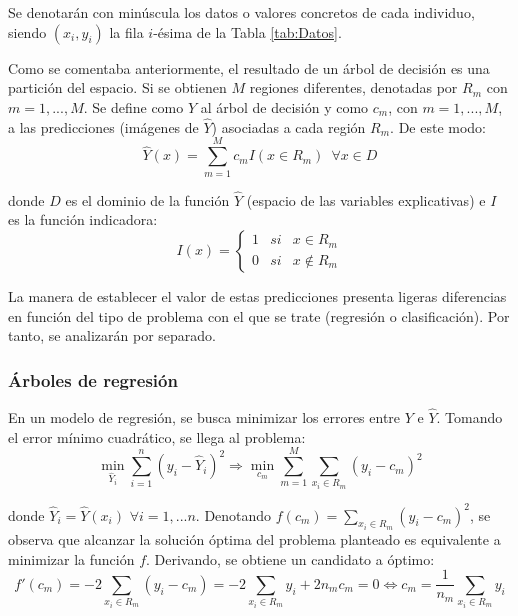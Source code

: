 \documentclass[12pt,twoside]{article}
\begin{document}
Se denotarán con minúscula los datos o valores concretos de cada individuo, siendo $(x_i, y_i)$ la fila $i$-ésima de la Tabla \ref{tab:Datos}.

Como se comentaba anteriormente, el resultado de un árbol de decisión es una partición del espacio. Si se obtienen $M$ regiones diferentes, denotadas por $R_{m}$ con $m = 1, ..., M$. Se define como $\hat{Y}$ al árbol de decisión y como $c_m$, con $m = 1,...,M$, a las predicciones (imágenes de $\hat{Y}$) asociadas a cada región $R_m$. De este modo:
\begin{equation*}
\hat{Y}(x) = \sum^M_{m = 1} c_{m}I(x \in R_m) \, \, \, \forall x \in D
\end{equation*}

\noindent
donde $D$ es el dominio de la función $\hat{Y}$ (espacio de las variables explicativas) e $I$ es la función indicadora:
\begin{equation*}
I(x) = 
\left\{
\begin{array}{ccc}
1 & si & x \in R_m \\
0 & si & x \not\in R_m 
\end{array}
\right.
\end{equation*}

La manera de establecer el valor de estas predicciones presenta ligeras diferencias en función del tipo de problema con el que se trate (regresión o clasificación). Por tanto, se analizarán por separado.


\subsubsection{Árboles de regresión}
En un modelo de regresión, se busca minimizar los errores entre $Y$ e $\hat{Y}$. Tomando el error mínimo cuadrático, se llega al problema:
\begin{equation*}
\min_{\hat{Y}_i} \sum_{i=1}^n (y_i - \hat{Y}_i)^2 \Rightarrow \min_{c_m} \sum_{m = 1}^M \sum_{x_i \in R_m} (y_i - c_m)^2
\end{equation*}

\noindent
donde $\hat{Y}_i = \hat{Y}(x_i) \, \, \forall i=1,...n$. Denotando $f(c_m) = \sum_{x_i \in R_m} (y_i - c_m)^2$, se observa que alcanzar la solución óptima del problema planteado es equivalente a minimizar la función $f$. Derivando, se obtiene un candidato a óptimo:
\begin{equation}
\label{eq:01}
f'(c_m) = -2 \sum_{x_i \in R_m} (y_i - c_m) = -2 \sum_{x_i \in R_m}y_i + 2n_mc_m = 0 \Leftrightarrow c_m = \frac{1}{n_m} \sum_{x_i \in R_m}y_i
\end{equation}
\end{document}
